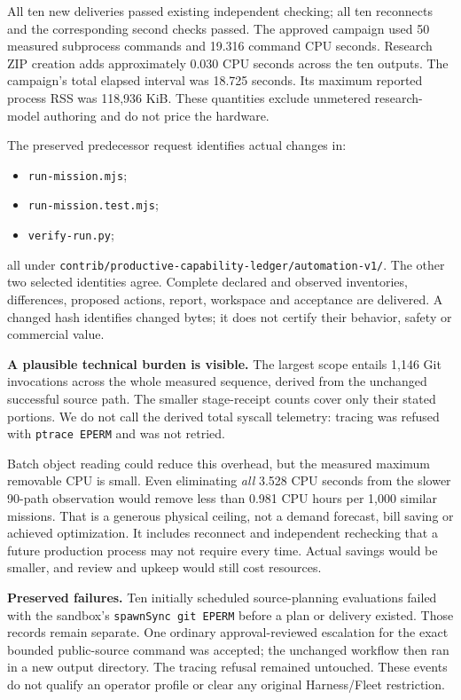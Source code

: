\documentclass[11pt,letterpaper]{article}
\newcommand{\code}[1]{{\small\nolinkurl{#1}}}
\begin{document}
All ten new deliveries passed existing independent checking; all ten reconnects and the corresponding second checks passed. The approved campaign used 50 measured subprocess commands and 19.316 command CPU seconds. Research ZIP creation adds approximately 0.030 CPU seconds across the ten outputs. The campaign's total elapsed interval was 18.725 seconds. Its maximum reported process RSS was 118,936 KiB. These quantities exclude unmetered research-model authoring and do not price the hardware.\cite{sourceprofile}

The preserved predecessor request identifies actual changes in:
\begin{itemize}
\item \code{run-mission.mjs};
\item \code{run-mission.test.mjs};
\item \code{verify-run.py};
\end{itemize}
all under \code{contrib/productive-capability-ledger/automation-v1/}. The other two selected identities agree. Complete declared and observed inventories, differences, proposed actions, report, workspace and acceptance are delivered. A changed hash identifies changed bytes; it does not certify their behavior, safety or commercial value.

\textbf{A plausible technical burden is visible.} The largest scope entails 1,146 Git invocations across the whole measured sequence, derived from the unchanged successful source path. The smaller stage-receipt counts cover only their stated portions. We do not call the derived total syscall telemetry: tracing was refused with \code{ptrace EPERM} and was not retried.

Batch object reading could reduce this overhead, but the measured maximum removable CPU is small. Even eliminating \emph{all} 3.528 CPU seconds from the slower 90-path observation would remove less than 0.981 CPU hours per 1,000 similar missions. That is a generous physical ceiling, not a demand forecast, bill saving or achieved optimization. It includes reconnect and independent rechecking that a future production process may not require every time. Actual savings would be smaller, and review and upkeep would still cost resources.

\textbf{Preserved failures.} Ten initially scheduled source-planning evaluations failed with the sandbox's \code{spawnSync git EPERM} before a plan or delivery existed. Those records remain separate. One ordinary approval-reviewed escalation for the exact bounded public-source command was accepted; the unchanged workflow then ran in a new output directory. The tracing refusal remained untouched. These events do not qualify an operator profile or clear any original Harness/Fleet restriction.
\end{document}
